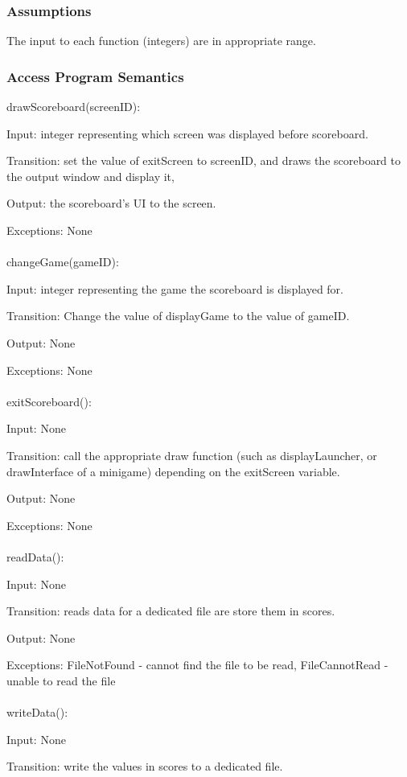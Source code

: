 \documentclass[12pt, titlepage]{article}
\begin{document}
		\subsubsection{Assumptions}
		The input to each function (integers) are in appropriate range.
		\subsubsection{Access Program Semantics}
		
		drawScoreboard(screenID):
		
		Input: integer representing which screen was displayed before scoreboard.
		
		Transition: set the value of exitScreen to screenID, and draws the scoreboard to the output window and display it,
		
		Output: the scoreboard's UI to the screen.
		
		Exceptions: None\\
		\\
		changeGame(gameID):
		
		Input: integer representing the game the scoreboard is displayed for.
		
		Transition: Change the value of displayGame to the value of gameID.
		
		Output: None
		
		Exceptions: None\\
		\\
		exitScoreboard():
		
		Input: None
		
		Transition: call the appropriate draw function (such as displayLauncher, or drawInterface of a minigame) depending on the exitScreen variable.
		
		Output: None
		
		Exceptions: None\\
		\\
		readData():
		
		Input: None
		
		Transition: reads data for a dedicated file are store them in scores.
		
		Output: None
		
		Exceptions: FileNotFound - cannot find the file to be read, FileCannotRead - unable to read the file\\
		\\
		writeData():
		
		Input: None
		
		Transition: write the values in scores to a dedicated file.
		
\end{document}
